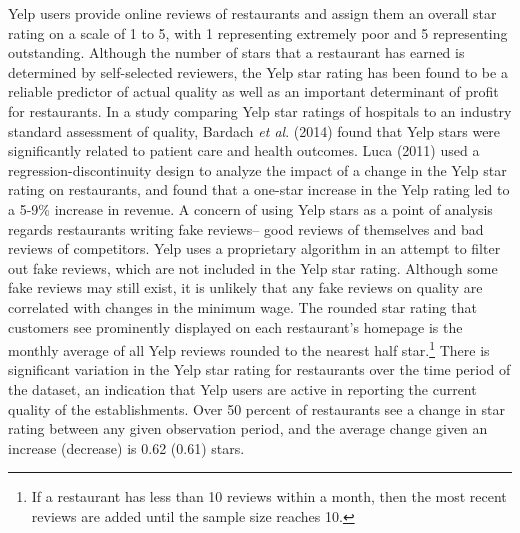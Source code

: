 \documentclass[11pt]{article}
\newcommand{\etal}{\textit{et al}. }
\begin{document}
Yelp users provide online reviews of restaurants and assign them an overall star rating on a scale of 1 to 5, with 1 representing extremely poor and 5 representing outstanding. Although the number of stars that a restaurant has earned is determined by self-selected reviewers, the Yelp star rating has been found to be a reliable predictor of actual quality as well as an important determinant of profit for restaurants. In a study comparing Yelp star ratings of hospitals to an industry standard assessment of quality, Bardach \etal (2014) found that Yelp stars were significantly related to patient care and health outcomes\nocite{bardach2012relationship}. Luca (2011) used a regression-discontinuity design to analyze the impact of a change in the Yelp star rating on restaurants, and found that a one-star increase in the Yelp rating led to a 5-9\% increase in revenue\nocite{luca2011reviews}. A concern of using Yelp stars as a point of analysis regards restaurants writing fake reviews-- good reviews of themselves and bad reviews of competitors. Yelp uses a proprietary algorithm in an attempt to filter out fake reviews, which are not included in the Yelp star rating. Although some fake reviews may still exist, it is unlikely that any fake reviews on quality are correlated with changes in the minimum wage. The rounded star rating that customers see prominently displayed on each restaurant's homepage is the monthly average of all Yelp reviews rounded to the nearest half star.\footnote{If a restaurant has less than 10 reviews within a month, then the most recent reviews are added until the sample size reaches 10.} There is significant variation in the Yelp star rating for restaurants over the time period of the dataset, an indication that Yelp users are active in reporting the current quality of the establishments. Over 50 percent of restaurants see a change in star rating between any given observation period, and the average change given an increase (decrease) is 0.62 (0.61) stars. 

\end{document}
